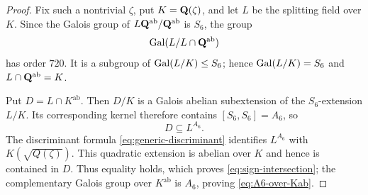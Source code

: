 \begin{proof}
Fix such a nontrivial $\zeta$, put $K=\mathbf Q(\zeta)$, and let $L$ be the
splitting field over $K$.  Since the Galois group of
$L\mathbf Q^{\mathrm{ab}}/\mathbf Q^{\mathrm{ab}}$ is $S_6$, the group
\[
 \operatorname{Gal}(L/L\cap\mathbf Q^{\mathrm{ab}})
\]
has order $720$.  It is a subgroup of $\operatorname{Gal}(L/K)\le S_6$; hence
$\operatorname{Gal}(L/K)=S_6$ and $L\cap\mathbf Q^{\mathrm{ab}}=K$.

Put $D=L\cap K^{\mathrm{ab}}$.  Then $D/K$ is a Galois abelian
subextension of the $S_6$-extension $L/K$.  Its corresponding kernel
therefore contains $[S_6,S_6]=A_6$, so
\[
 D\subseteq L^{A_6}.
\]
The discriminant formula \eqref{eq:generic-discriminant} identifies
$L^{A_6}$ with $K(\sqrt{Q(\zeta)})$.  This quadratic extension is
abelian over $K$ and hence is contained in $D$.  Thus equality holds,
which proves \eqref{eq:sign-intersection}; the complementary Galois
group over $K^{\mathrm{ab}}$ is $A_6$, proving
\eqref{eq:A6-over-Kab}.
\end{proof}
